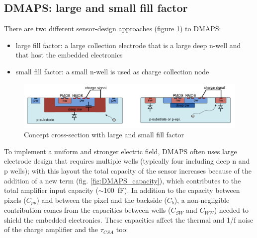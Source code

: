    \subsection{DMAPS: large and small fill factor}\label{sec:small-large-fill-factor}
      There are two different sensor-design approaches (figure \ref{fig:large_small_sensor_scheme})
      to DMAPS:
      \begin{itemize}
         \item large fill factor: a large collection electrode that is a large deep n-well
      and that host the embedded electronics
         \item small fill factor: a small n-well is used as charge collection node
      \end{itemize}
      \begin{figure}
         \centering\includegraphics[width=15cm]{figures/Pixel_detectors/large_small_sensor_scheme.png}
         \caption{Concept cross-section with large and small fill factor}
         \label{fig:large_small_sensor_scheme}
      \end{figure}
      To implement a uniform and stronger electric field, DMAPS often uses large electrode design that requires multiple wells (typically four including deep n and p wells); with this layout the total capacity of the sensor increases because of the addition of a new term (fig. \ref{fig:DMAPS_capacity}), which contributes to the total amplifier input capacity ($\sim$\SI{100}{fF}). In addition to the capacity between pixels ($C_{pp}$) and between the pixel and the backside ($C_{b}$), a non-negligible contribution comes from the capacities between wells ($C_{SW}$ and $C_{WW}$) needed to shield the embedded electronics. These capacities affect the thermal and 1/f noise of the charge amplifier and the $ \tau_{CSA}$ too:

